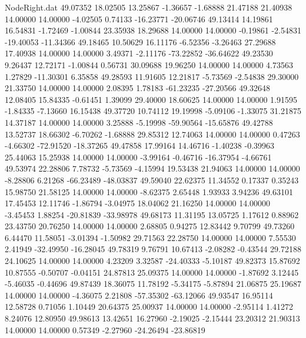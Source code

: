 \begin{filecontents}{NodeRight.dat}
  49.07352   18.02505   13.25867    -1.36657   -1.68888   21.47188   21.40938   14.00000   14.00000   -4.02505    0.74133  -16.23771  -20.06746
  49.13414   14.19861   16.54831    -1.72469   -1.00844   23.35938   18.29688   14.00000   14.00000   -0.19861   -2.54831  -19.40053  -11.34366
  49.18465   10.50629   16.11176    -6.52356   -3.26463   27.29688   17.40938   14.00000   14.00000    3.49371   -2.11176  -73.22852  -36.64622
  49.23530    9.26437   12.72171    -1.00844    0.56731   30.09688   19.96250   14.00000   14.00000    4.73563    1.27829  -11.30301    6.35858
  49.28593   11.91605   12.21817    -5.73569   -2.54838   29.30000   21.33750   14.00000   14.00000    2.08395    1.78183  -61.23235  -27.20566
  49.32648   12.08405   15.84335    -0.61451    1.39099   29.40000   18.60625   14.00000   14.00000    1.91595   -1.84335   -7.13660   16.15438
  49.37720   10.74112   19.19998    -5.09106   -1.33075   31.21875   14.37187   14.00000   14.00000    3.25888   -5.19998  -59.90564  -15.65876
  49.42788   13.52737   18.66302    -6.70262   -1.68888   29.85312   12.74063   14.00000   14.00000    0.47263   -4.66302  -72.91520  -18.37265
  49.47858   17.99164   14.46716    -1.40238   -0.39963   25.44063   15.25938   14.00000   14.00000   -3.99164   -0.46716  -16.37954   -4.66761
  49.53974   22.28806    7.78732    -5.73569   -4.15994   19.53438   21.94063   14.00000   14.00000   -8.28806    6.21268  -66.23489  -48.03837
  49.59040   22.62375   11.34552     0.17337    0.35243   15.98750   21.58125   14.00000   14.00000   -8.62375    2.65448    1.93933    3.94236
  49.63101   17.45453   12.11746    -1.86794   -3.04975   18.04062   21.16250   14.00000   14.00000   -3.45453    1.88254  -20.81839  -33.98978
  49.68173   11.31195   13.05725     1.17612    0.88962   23.43750   20.76250   14.00000   14.00000    2.68805    0.94275   12.83442    9.70799
  49.73260    6.44470   11.58051    -3.01394   -1.50982   29.71563   22.28750   14.00000   14.00000    7.55530    2.41949  -32.49950  -16.28045
  49.78319    9.76791   10.67413    -2.08282   -0.43544   29.72188   24.10625   14.00000   14.00000    4.23209    3.32587  -24.40333   -5.10187
  49.82373   15.87692   10.87555    -0.50707   -0.04151   24.87813   25.09375   14.00000   14.00000   -1.87692    3.12445   -5.46035   -0.44696
  49.87439   18.36075   11.78192    -5.34175   -5.87894   21.06875   25.19687   14.00000   14.00000   -4.36075    2.21808  -57.35302  -63.12066
  49.93547   16.95114   12.58728     0.71056    1.10449   20.64375   25.00937   14.00000   14.00000   -2.95114    1.41272    8.24076   12.80950
  49.98613   13.42651   16.27960    -2.19025   -2.15444   23.20312   21.90313   14.00000   14.00000    0.57349   -2.27960  -24.26494  -23.86819

\end{filecontents}
